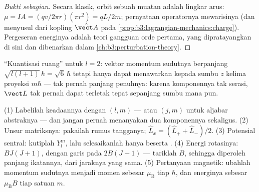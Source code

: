 \begin{proof}[Bukti sebagian]
Secara klasik, orbit sebuah muatan adalah lingkar arus:
$\mu = IA = (qv/2\pi r)(\pi r^2) = qL/2m$; pernyataan
operatornya mewarisinya
(dan menyusul dari kopling $\hat{\vect A}$ pada
\cref{prop:b3:lagrangian-mechanics:charge}). Pergeseran energinya adalah
teori gangguan orde pertama, yang dipratayangkan di sini dan dibenarkan
dalam \cref{ch:b3:perturbation-theory}.
\end{proof}

\begin{omfigure}

{\small ``Kuantisasi ruang'' untuk $l = 2$: vektor momentum sudutnya
berpanjang $\sqrt{l(l+1)}\,\hbar = \sqrt6\,\hbar$ tetapi hanya dapat
menawarkan kepada sumbu $z$ kelima proyeksi $m\hbar$ --- tak pernah
panjang penuhnya: karena komponennya tak serasi, $\vect L$ tak pernah
dapat terletak tepat sepanjang sumbu mana pun.}
\end{omfigure}

\begin{method}\label{met:b3:quantum-angular-momentum:method}
(1) Labelilah keadaannya dengan $(l, m)$ --- atau $(j, m)$ untuk
aljabar abstraknya --- dan jangan pernah menanyakan dua komponennya
sekaligus. (2) Unsur matriksnya: pakailah rumus tangganya;
$\hat L_x = (\hat L_+ + \hat
L_-)/2$. (3) Potensial sentral: kutiplah $Y_l^m$, lalu selesaikanlah
hanya  beserta . (4) Energi
rotasinya: $BJ(J+1)$, dengan garis pada $2B(J+1)$ --- tariklah $B$,
sehingga diperoleh panjang ikatannya, dari jaraknya yang sama. (5)
Pertanyaan magnetik: ubahlah momentum sudutnya menjadi momen sebesar
$\mu_{\text{B}}$ tiap $\hbar$, dan energinya sebesar $\mu_{\text{B}}B$
tiap satuan $m$.
\end{method}

